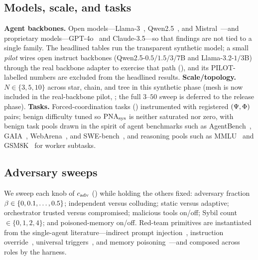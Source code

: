 \subsection{Models, scale, and tasks}
\textbf{Agent backbones.} Open models---Llama-3~\cite{dubey2024llama3},
Qwen2.5~\cite{qwen2025qwen25}, and Mistral~\cite{jiang2023mistral7b}---and proprietary
models---GPT-4o~\cite{openai2024gpt4o} and Claude-3.5---so that findings are not tied to a
single family. The headlined tables run the transparent synthetic model; a small
\emph{pilot} wires open instruct backbones (Qwen2.5-$0.5/1.5/3/7$B and Llama-3.2-$1/3$B)
through the real backbone adapter to exercise that path (), and its
PILOT-labelled numbers are excluded from the headlined results. \textbf{Scale/topology.} $N\in\{3,5,10\}$ across star, chain, and tree in this
synthetic phase (mesh is now included in the real-backbone pilot,
; the full $3$--$50$ sweep is deferred to the release phase).
\textbf{Tasks.} Forced-coordination tasks () instrumented with registered
$(\Psi,\Phi)$ pairs; benign difficulty tuned so $\mathrm{PNA}_{\mathrm{sys}}$ is neither saturated nor
zero, with benign task pools drawn in the spirit of agent benchmarks such as
AgentBench~\cite{liu2024agentbench}, GAIA~\cite{mialon2024gaia},
WebArena~\cite{zhou2024webarena}, and SWE-bench~\cite{jimenez2024swebench}, and reasoning
pools such as MMLU~\cite{hendrycks2021measuring} and GSM8K~\cite{cobbe2021gsm8k} for worker
subtasks.

\subsection{Adversary sweeps}
We sweep each knob of $c_{\mathrm{adv}}$ () while holding the
others fixed: adversary fraction $\beta\in\{0,0.1,\dots,0.5\}$; independent versus
colluding; static versus adaptive; orchestrator trusted versus compromised; malicious tools
on/off; Sybil count $\in\{0,1,2,4\}$; and poisoned-memory on/off. Red-team primitives are
instantiated from the single-agent literature---indirect prompt
injection~\cite{greshake2023indirect,zhan2024injecagent}, instruction
override~\cite{perez2022ignore}, universal triggers~\cite{zou2023universal}, and
memory poisoning~\cite{chen2024agentpoison}---and composed across roles by the harness.

